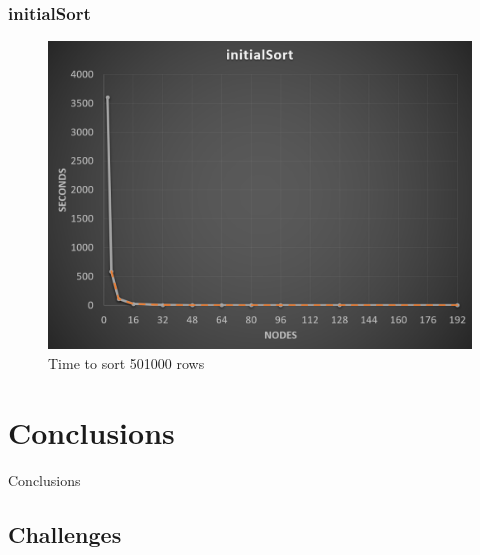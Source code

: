 \documentclass{beamer}
\begin{document}
\begin{frame}	
	\frametitle{initialSort}
	
	\begin{figure}[!htb]
		\centering
		\vspace{-5pt}
		\includegraphics[scale = 0.30]{initialSort.png}
		\vspace{-10pt}
		\caption{Time to sort 501000 rows}
	\end{figure}
	
\end{frame}



\section{Conclusions}

\begin{frame}	
	\begin{Huge}
		\begin{center}
			Conclusions
		\end{center}
	\end{Huge}
\end{frame}

\subsection{Challenges}
\end{document}

